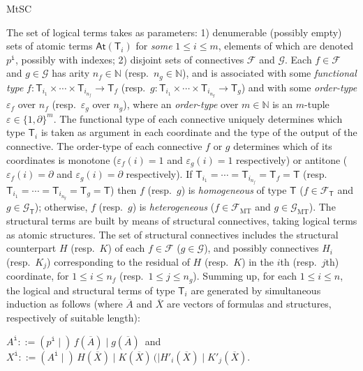 \begin{entry}{MtSC}
\begin{clarifications}
The set  of logical terms takes as parameters: 1) denumerable (possibly empty) sets of atomic terms $\mathsf{At}(\mathsf{T}_i)$ for {\em some} $1\leq i\leq m$, elements of which are denoted $p^{\texttt{i}}$, possibly with indexes; 2) disjoint sets of connectives $\mathcal{F}$ and $\mathcal{G}$. Each $f\in \mathcal{F}$ and $g\in \mathcal{G}$ has arity $n_f\in \mathbb{N}$ (resp.\ $n_g\in \mathbb{N}$), and is associated with some {\em functional type} $f: \mathsf{T}_{i_1}\times\cdots \times \mathsf{T}_{i_{n_f}}\to \mathsf{T}_{f}$ (resp.~$g: \mathsf{T}_{i_1}\times\cdots \times \mathsf{T}_{i_{n_g}}\to \mathsf{T}_{g}$) and with some {\em order-type} $\varepsilon_f$ over $n_f$ (resp.~$\varepsilon_g$ over $n_g$), where an {\em order-type} over $m\in \mathbb{N}$ is an $m$-tuple $\varepsilon\in \{1, \partial\}^m$. 
The functional type of each connective uniquely determines which type $\mathsf{T}_i$ is taken as argument in each coordinate  and the type of the output of the connective. The order-type   of each connective $f$ or $g$ determines which of its coordinates is monotone ($\varepsilon_f(i) = 1$ and $\varepsilon_g(i) = 1$ respectively) or antitone ($\varepsilon_f(i) = \partial$ and $\varepsilon_g(i) = \partial$ respectively). If $\mathsf{T}_{i_1} = \cdots  =  \mathsf{T}_{i_{n_f}} =  \mathsf{T}_{f} = \mathsf{T}$ (resp.\ $\mathsf{T}_{i_1} = \cdots  =  \mathsf{T}_{i_{n_g}} =  \mathsf{T}_{g} = \mathsf{T}$) then $f$ (resp.\ $g$) is {\em homogeneous} of type $\mathsf{T}$ ($f\in \mathcal{F}_{\mathsf{T}}$ and $g\in \mathcal{G}_{\mathsf{T}}$); otherwise, $f$ (resp.\ $g$) is {\em heterogeneous} ($f\in \mathcal{F}_{\mathrm{MT}}$ and $g\in \mathcal{G}_{\mathrm{MT}}$). The structural terms are built by means of structural connectives, taking logical terms as atomic structures. The set of structural connectives includes the structural counterpart $H$ (resp.~$K$) of each $f\in \mathcal{F}$ ($g\in \mathcal{G}$), and possibly connectives $H_i$ (resp.~$K_j$) corresponding to the residual of $H$ (resp.~$K$) in the $i$th (resp.~$j$th) coordinate, for $1\leq i\leq n_f$ (resp.~$1\leq j\leq n_g$). Summing up, for each $1\leq i\leq n$, the logical and structural terms of type $\mathsf{T}_i$ are generated by simultaneous induction as follows (where $\overline{A}$ and $\overline{X}$ are vectors of formulas and structures, respectively of suitable length): 
\begin{center}
$A^{\texttt{i}} ::= (p^{\texttt{i}} \mid)\, f(\overline{A}) \mid g(\overline{A})\,$ \qquad and \qquad $X^{\texttt{i}} ::= (A^{\texttt{i}} \mid)\, H(\overline{X}) \mid K(\overline{X}) \, (\mid H'_i(\overline{X}) \mid K'_j(\overline{X})$.
\end{center}


\end{clarifications}
\end{entry}
